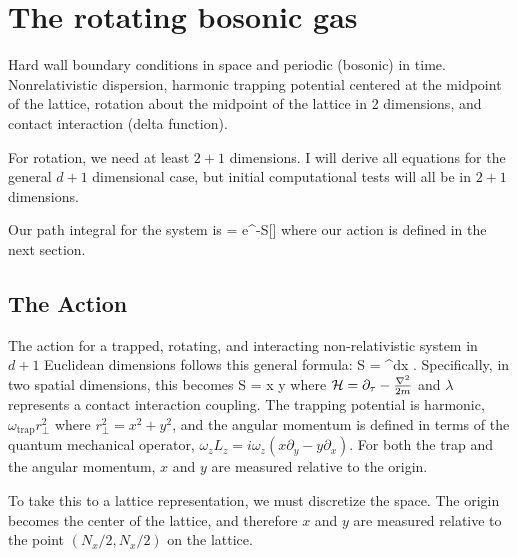 \documentclass[../../RotatingBosons.tex]{subfiles}
\begin{document}
\section{The rotating bosonic gas}
Hard wall boundary conditions in space and periodic (bosonic) in time. Nonrelativistic dispersion, harmonic trapping potential centered at the midpoint of the lattice, rotation about the midpoint of the lattice in 2 dimensions, and contact interaction (delta function).

For rotation, we need at least $2+1$ dimensions. I will derive all equations for the general $d+1$ dimensional case, but initial computational tests will all be in $2+1$ dimensions.

Our path integral for the system is 
%
\beq
\CZ = \int \dif \phi e^{-S[\phi]}
\eeq
%
where our action is defined in the next section.
\subsection{The Action}
The action for a trapped, rotating, and interacting non-relativistic system in $d+1$ Euclidean dimensions follows this general formula:
%
\beq
S = \int \dif^{d}x \dif\tau {}.
\eeq 
%
Specifically, in two spatial dimensions, this becomes
%
\beq
S = \int \dif x \dif y \dif \tau {}
\eeq 
%
where ${\mathcal H} = \partial_{\tau} - \frac{{\nabla}^{2}}{2m} $ and $\lambda$ represents a contact interaction coupling. The trapping potential is harmonic, $\omega_{\text{trap}}r_{\perp}^{2}$ where $r_{\perp}^{2} = x^{2} + y^{2}$, and the angular momentum is defined in terms of the quantum mechanical operator, $\omega_{z}L_{z} = i \omega_{z}(x \partial_{y} - y\partial_{x})$. For both the trap and the angular momentum, $x$ and $y$ are measured relative to the origin.

To take this to a lattice representation, we must discretize the space. The origin becomes the center of the lattice, and therefore $x$ and $y$ are measured relative to the point $(N_{x}/2, N_{x}/2)$ on the lattice.
\end{document}
